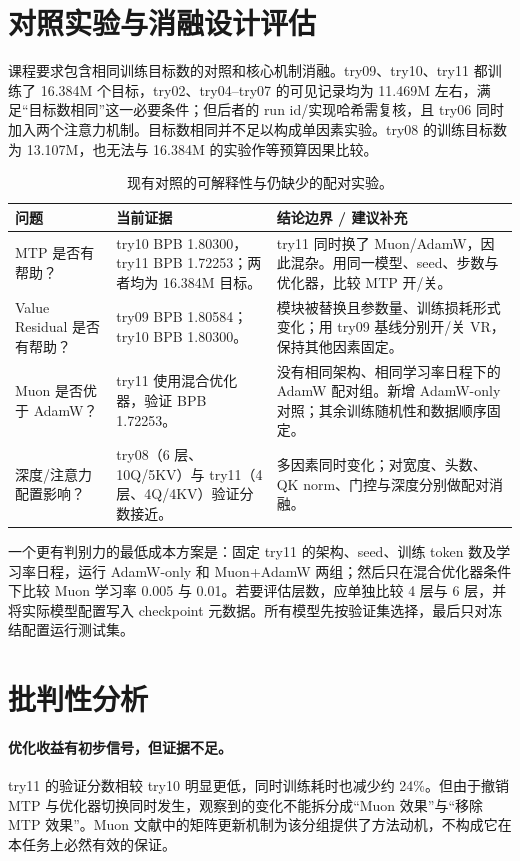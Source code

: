 \documentclass[UTF8,a4paper,11pt]{ctexart}
\begin{document}
\section{对照实验与消融设计评估}
课程要求包含相同训练目标数的对照和核心机制消融。try09、try10、try11 都训练了 16.384M 个目标，try02、try04--try07 的可见记录均为 11.469M 左右，满足“目标数相同”这一必要条件；但后者的 run id/实现哈希需复核，且 try06 同时加入两个注意力机制。目标数相同并不足以构成单因素实验。try08 的训练目标数为 13.107M，也无法与 16.384M 的实验作等预算因果比较。

\begin{table}[htbp]
\centering\small
\caption{现有对照的可解释性与仍缺少的配对实验。}
\label{tab:ablations}
\begin{tabularx}{\textwidth}{@{}l X X@{}}
\toprule
问题 & 当前证据 & 结论边界 / 建议补充 \\
\midrule
MTP 是否有帮助？ & try10 BPB 1.80300，try11 BPB 1.72253；两者均为 16.384M 目标。 & try11 同时换了 Muon/AdamW，因此混杂。用同一模型、seed、步数与优化器，比较 MTP 开/关。 \\
Value Residual 是否有帮助？ & try09 BPB 1.80584；try10 BPB 1.80300。 & 模块被替换且参数量、训练损耗形式变化；用 try09 基线分别开/关 VR，保持其他因素固定。 \\
Muon 是否优于 AdamW？ & try11 使用混合优化器，验证 BPB 1.72253。 & 没有相同架构、相同学习率日程下的 AdamW 配对组。新增 AdamW-only 对照；其余训练随机性和数据顺序固定。 \\
深度/注意力配置影响？ & try08（6 层、10Q/5KV）与 try11（4 层、4Q/4KV）验证分数接近。 & 多因素同时变化；对宽度、头数、QK norm、门控与深度分别做配对消融。 \\
\bottomrule
\end{tabularx}
\end{table}

一个更有判别力的最低成本方案是：固定 try11 的架构、seed、训练 token 数及学习率日程，运行 AdamW-only 和 Muon+AdamW 两组；然后只在混合优化器条件下比较 Muon 学习率 0.005 与 0.01。若要评估层数，应单独比较 4 层与 6 层，并将实际模型配置写入 checkpoint 元数据。所有模型先按验证集选择，最后只对冻结配置运行测试集。

\section{批判性分析}
\paragraph{优化收益有初步信号，但证据不足。} try11 的验证分数相较 try10 明显更低，同时训练耗时也减少约 24\%。但由于撤销 MTP 与优化器切换同时发生，观察到的变化不能拆分成“Muon 效果”与“移除 MTP 效果”。Muon 文献中的矩阵更新机制为该分组提供了方法动机\cite{muon}，不构成它在本任务上必然有效的保证。
\end{document}
